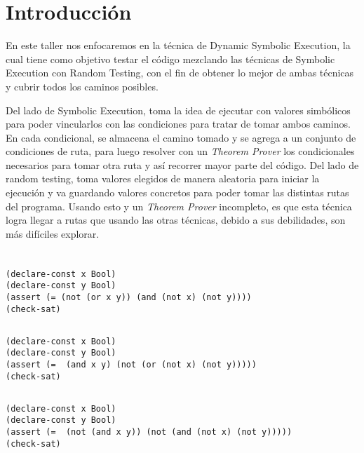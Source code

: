 \section*{Introducción}
En este taller nos enfocaremos en la técnica de Dynamic Symbolic Execution, la cual tiene como objetivo testar el código mezclando las técnicas de Symbolic Execution con Random Testing, con el fin de obtener lo mejor de ambas técnicas y cubrir todos los caminos posibles.
 
Del lado de Symbolic Execution, toma la idea de ejecutar con valores simbólicos para poder vincularlos con las condiciones para tratar de tomar ambos caminos. En cada condicional, se almacena el camino tomado y se agrega a un conjunto de condiciones de ruta, para luego resolver con un \textit{Theorem Prover} los condicionales necesarios para tomar otra ruta y así recorrer mayor parte del código.
Del lado de random testing, toma valores elegidos de manera aleatoria para iniciar la ejecución y va guardando valores concretos para poder tomar las distintas rutas del programa. Usando esto y un \textit{Theorem Prover} incompleto, es que esta técnica logra llegar a rutas que usando las otras técnicas, debido a sus debilidades, son más difíciles explorar.

\section{}
\subsection{}
\begin{verbatim}
(declare-const x Bool)
(declare-const y Bool)
(assert (= (not (or x y)) (and (not x) (not y))))
(check-sat)
\end{verbatim}

\subsection{}
\begin{verbatim}
(declare-const x Bool)
(declare-const y Bool)
(assert (=  (and x y) (not (or (not x) (not y)))))
(check-sat)
\end{verbatim}

\subsection{}
\begin{verbatim}
(declare-const x Bool)
(declare-const y Bool)
(assert (=  (not (and x y)) (not (and (not x) (not y)))))
(check-sat)
\end{verbatim}

